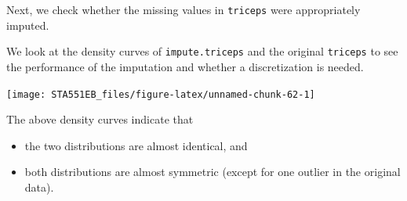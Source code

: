 \documentclass[
]{book}
\newenvironment{Shaded}{\begin{snugshade}}{\end{snugshade}}
\newcommand{\AttributeTok}[1]{\textcolor[rgb]{0.13,0.29,0.53}{#1}}
\newcommand{\DecValTok}[1]{\textcolor[rgb]{0.00,0.00,0.81}{#1}}
\newcommand{\FloatTok}[1]{\textcolor[rgb]{0.00,0.00,0.81}{#1}}
\newcommand{\FunctionTok}[1]{\textcolor[rgb]{0.13,0.29,0.53}{\textbf{#1}}}
\newcommand{\NormalTok}[1]{#1}
\newcommand{\OtherTok}[1]{\textcolor[rgb]{0.56,0.35,0.01}{#1}}
\newcommand{\SpecialCharTok}[1]{\textcolor[rgb]{0.81,0.36,0.00}{\textbf{#1}}}
\newcommand{\StringTok}[1]{\textcolor[rgb]{0.31,0.60,0.02}{#1}}
\begin{document}
\begin{Shaded}
\end{Shaded}

Next, we check whether the missing values in \texttt{triceps} were appropriately imputed.

We look at the density curves of \texttt{impute.triceps} and the original \texttt{triceps} to see the performance of the imputation and whether a discretization is needed.

\begin{Shaded}
\end{Shaded}

\begin{center}\texttt{[image: STA551EB\_files/figure-latex/unnamed-chunk-62-1]} \end{center}

The above density curves indicate that

\begin{itemize}
\item
  the two distributions are almost identical, and
\item
  both distributions are almost symmetric (except for one outlier in the original data).
\end{itemize}
\end{document}
